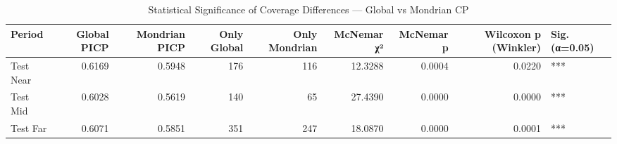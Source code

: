 \begin{table}
\caption{Statistical Significance of Coverage Differences — Global vs Mondrian CP}
\label{tab:t4b_5_significance}
\begin{tabular}{lrrrrrrrl}
\toprule
Period & Global PICP & Mondrian PICP & Only Global & Only Mondrian & McNemar χ² & McNemar p & Wilcoxon p (Winkler) & Sig. (α=0.05) \\
\midrule
Test Near & 0.6169 & 0.5948 & 176 & 116 & 12.3288 & 0.0004 & 0.0220 & *** \\
Test Mid & 0.6028 & 0.5619 & 140 & 65 & 27.4390 & 0.0000 & 0.0000 & *** \\
Test Far & 0.6071 & 0.5851 & 351 & 247 & 18.0870 & 0.0000 & 0.0001 & *** \\
\bottomrule
\end{tabular}
\end{table}
